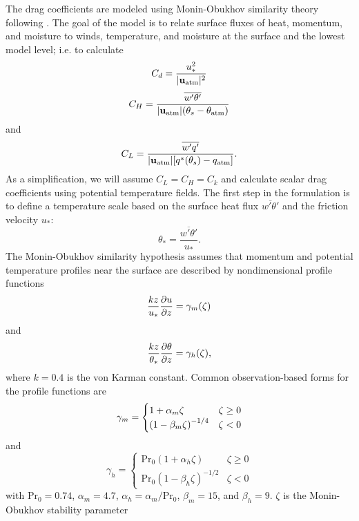 \documentclass[10pt]{article}
\begin{document}
The drag coefficients are modeled using Monin-Obukhov similarity theory following \citet{Byun1990}. The goal of the model is to relate surface fluxes of heat, momentum, and moisture to winds, temperature, and moisture at the surface and the lowest model level; i.e. to calculate
\begin{equation*}
C_d = \frac{u_*^2}{|{\bf u}_{\mathrm{atm}}|^2}
\end{equation*}
\begin{equation*}
C_H = \frac{\overline{w' \theta'}} {|{\bf u}_{\mathrm{atm}}| (\theta_s - \theta_{\mathrm{atm}})}
\end{equation*}
and
\begin{equation*}
C_L = \frac{\overline{w'q'}} {|{\bf u}_{\mathrm{atm}}| \qty [q^*(\theta_s) - q_{\mathrm{atm}}]}.
\end{equation*}
As a simplification, we will assume $C_L = C_H = C_k$ and calculate scalar drag coefficients using potential temperature fields. The first step in the formulation is to define a temperature scale based on the surface heat flux $\overline{w' \theta'}$ and the friction velocity $u_*$:
\begin{equation*}
\theta_* = \frac{\overline{w' \theta'}}{u_*}.
\end{equation*}
The Monin-Obukhov similarity hypothesis assumes that momentum and potential temperature profiles near the surface are described by nondimensional profile functions
\begin{equation*}
\frac{kz}{u_*} \pdv{u}{z} = \gamma_m \qty(\zeta)
\end{equation*}
and
\begin{equation*}
\frac{kz}{\theta_*}\pdv{\theta}{z} = \gamma_h \qty(\zeta),
\end{equation*}
where $k = 0.4$ is the von Karman constant. Common observation-based forms for the profile functions \citep{BusingerEtAl1971} are
\[
\gamma_m = 
\begin{cases}
1 + \alpha_m \zeta & \zeta \ge 0 \\
\qty(1 - \beta_m \zeta)^{-1/4} & \zeta < 0
\end{cases}
\]
and
\[
\gamma_h = 
\begin{cases}
\mathrm{Pr}_0 (1 + \alpha_h \zeta) & \zeta \ge 0 \\
\mathrm{Pr}_0 (1 - \beta_h \zeta)^{-1/2} &  \zeta < 0
\end{cases}
\]
with $\mathrm{Pr}_0 = 0.74$, $\alpha_m = 4.7$, $\alpha_h = \alpha_m/\mathrm{Pr}_0$, $\beta_m = 15$, and $\beta_h = 9$. $\zeta$ is the Monin-Obukhov stability parameter
\end{document}
